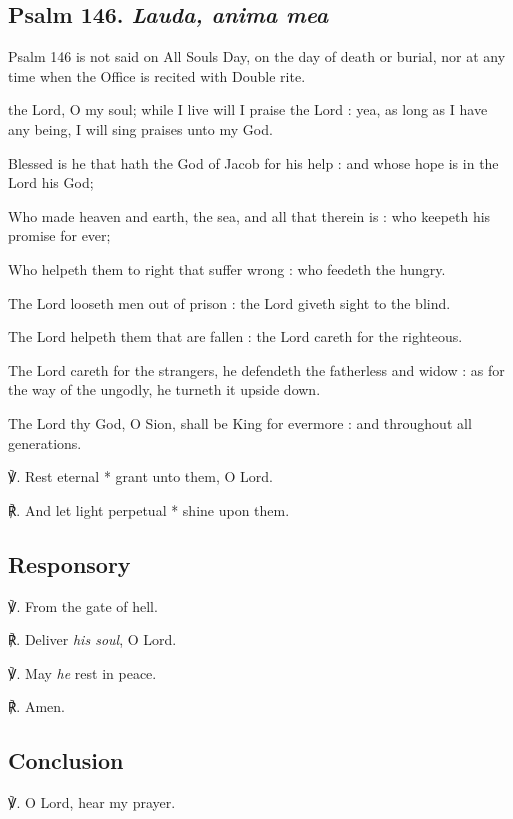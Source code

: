 \subsection{Psalm 146. \textit{Lauda, anima mea}}
\begin{rubric}
{Psalm 146 is not said on All Souls Day, on the day of death or burial, nor at any time when the Office is recited with Double rite.}
\end{rubric}
 the Lord, O my soul; while I live will I praise the Lord : yea, as long as I have any being, I will sing praises unto my God.\par
{}
Blessed is he that hath the God of Jacob for his help : and whose hope is in the Lord his God;\par
{}Who made heaven and earth, the sea, and all that therein is : who keepeth his promise for ever;\par
{}Who helpeth them to right that suffer wrong : who feedeth the hungry.\par
{}The Lord looseth men out of prison : the Lord giveth sight to the blind.\par
{}The Lord helpeth them that are fallen : the Lord careth for the righteous.\par
{}The Lord careth for the strangers, he defendeth the fatherless and widow : as for the way of the ungodly, he turneth it upside down.\par
{}The Lord thy God, O Sion, shall be King for evermore : and throughout all generations.
\par
℣. Rest eternal * grant unto them, O Lord.\par
℟. And let light perpetual * shine upon them.

\subsection{Responsory}
℣. From the gate of hell.

℟. Deliver \textit{his soul}, O Lord.

℣. May \textit{he} rest in peace.

℟. Amen.

\subsection{Conclusion}
℣. O Lord, hear my prayer.

